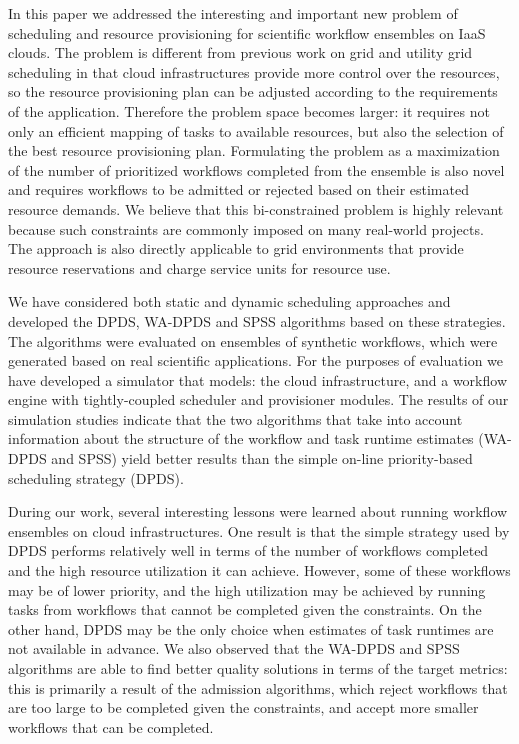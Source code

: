 \documentclass{sig-alternate}
\begin{document}
In this paper we addressed the interesting and important new problem of 
scheduling and resource provisioning for scientific workflow ensembles 
on IaaS clouds. The problem is different from previous work on grid and 
utility grid scheduling in that cloud infrastructures provide more control 
over the resources, so the resource provisioning plan can be adjusted 
according to the requirements of the application. Therefore the problem 
space becomes larger: it requires not only an efficient mapping of tasks
to available resources, but also the selection of the best resource 
provisioning plan. Formulating the problem as a maximization of the
number of prioritized workflows completed from the ensemble is also novel and  
requires workflows to be admitted or rejected based on their estimated 
resource demands. We believe that this bi-constrained problem is highly 
relevant because such constraints are commonly imposed on many real-world 
projects. The approach is also directly applicable to grid environments 
that provide resource reservations and charge service units for resource use.

We have considered both static and dynamic scheduling approaches and 
developed the DPDS, WA-DPDS and SPSS algorithms based on these 
strategies. The algorithms were evaluated on ensembles of synthetic 
workflows, which were generated based on real scientific applications. For 
the purposes of evaluation we have developed a simulator that models: the 
cloud infrastructure, and a workflow engine with tightly-coupled scheduler 
and provisioner modules. The results of our simulation studies indicate 
that the two algorithms that take into account information about the 
structure of the workflow and task runtime estimates (WA-DPDS and SPSS) 
yield better results than the simple on-line priority-based scheduling 
strategy (DPDS).

During our work, several interesting lessons were learned about running 
workflow ensembles on cloud infrastructures. One result is that the simple 
strategy used by DPDS performs relatively well in terms of the number of 
workflows completed and the high resource utilization it can achieve. However,
some of these workflows may be of lower priority, and the high utilization
may be achieved by running tasks from workflows that cannot be completed
given the constraints. On the other hand, DPDS may be the only choice when 
estimates of task runtimes are not available in advance. We also observed
that the WA-DPDS and SPSS algorithms are able to find better quality 
solutions in terms of the target metrics: this is primarily a result of the 
admission algorithms, which reject workflows that are too large to be 
completed given the constraints, and accept more smaller workflows that 
can be completed.
\end{document}
